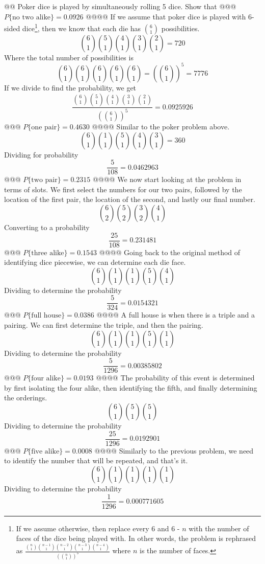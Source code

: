 \documentclass[10pt]{article}
\begin{document}
\begin{easylist}[enumerate]
    @@ Poker dice is played by simultaneously rolling 5 dice. Show that
    @@@ $ P\{\text{no two alike}\} = 0.0926 $
    @@@@ If we assume that poker dice is played with 6-sided dice\footnote{If we assume otherwise, then replace every 6 and 6 - $n$ with the number of faces of the dice being played with. In other words, the problem is rephrased as $\frac{\binom{n}{1} \binom{n - 1}{1} \binom{n - 2}{1} \binom{n - 3}{1} \binom{n - 4}{1} }{ {\left( \binom{n}{1} \right)}^5} $ where $n$ is the number of faces.}, then we know that each die has $\binom{6}{1}$ possibilities.
        \[ \binom{6}{1} \binom{5}{1} \binom{4}{1} \binom{3}{1} \binom{2}{1} = 720\]
        Where the total number of possibilities is
        \[ \binom{6}{1} \binom{6}{1} \binom{6}{1} \binom{6}{1} \binom{6}{1} = {\left( \binom{6}{1} \right)}^5 = 7776 \]
        If we divide to find the probability, we get
        \[ \frac{\binom{6}{1} \binom{5}{1} \binom{4}{1} \binom{3}{1} \binom{2}{1} }{ {\left( \binom{6}{1} \right)}^5} = \boxed{0.0925926} \]
    @@@ $ P\{\text{one pair}\} = 0.4630 $
    @@@@ Similar to the poker problem above.
        \[ \binom{6}{1} \binom{1}{1} \binom{5}{1} \binom{4}{1} \binom{3}{1} = 360 \]
        Dividing for probability
        \[ \frac{5}{108} = \boxed{0.0462963} \]
    @@@ $ P\{\text{two pair}\} = 0.2315 $
    @@@@ We now start looking at the problem in terms of slots. We first select the numbers for our two pairs, followed by the location of the first pair, the location of the second, and lastly our final number.
        \[ \binom{6}{2} \binom{5}{2} \binom{3}{2} \binom{4}{1} \]
        Converting to a probability
        \[ \frac{25}{108} = \boxed{0.231481} \]
    @@@ $ P\{\text{three alike}\} = 0.1543 $
    @@@@ Going back to the original method of identifying dice piecewise, we can determine each die face.
        \[ \binom{6}{1} \binom{1}{1} \binom{1}{1} \binom{5}{1} \binom{4}{1} \]
        Dividing to determine the probability
        \[ \frac{5}{324} = \boxed{0.0154321} \]
    @@@ $ P\{\text{full house}\} = 0.0386 $
    @@@@ A full house is when there is a triple and a pairing. We can first determine the triple, and then the pairing.
        \[ \binom{6}{1} \binom{1}{1} \binom{1}{1} \binom{5}{1} \binom{1}{1} \]
        Dividing to determine the probability
        \[ \frac{5}{1296} = \boxed{0.00385802} \]
    @@@ $ P\{\text{four alike}\} = 0.0193 $
    @@@@ The probability of this event is determined by first isolating the four alike, then identifying the fifth, and finally determining the orderings.
        \[ \binom{6}{1} \binom{5}{1} \binom{5}{1} \]
        Dividing to determine the probability
        \[ \frac{25}{1296} = \boxed{0.0192901} \]
    @@@ $ P\{\text{five alike}\} = 0.0008 $
    @@@@ Similarly to the previous problem, we need to identify the number that will be repeated, and that's it.
        \[ \binom{6}{1} \binom{1}{1} \binom{1}{1} \binom{1}{1} \binom{1}{1} \]
        Dividing to determine the probability
        \[ \frac{1}{1296} = \boxed{0.000771605} \]


\end{easylist}
\end{document}
